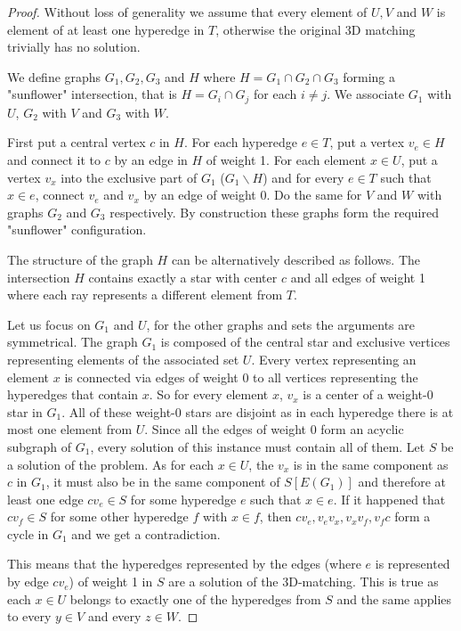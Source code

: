 \begin{proof}
Without loss of generality we assume that every element of $U,V$ and $W$ is element of at least one hyperedge in $T$, otherwise the original 3D matching trivially has no solution. 

We define graphs $G_1,G_2,G_3$ and $H$ where $H = G_1 \cap G_2 \cap G_3$ forming a "sunflower" intersection, that is $H = G_i \cap G_j$ for each $i \neq j$. We associate $G_1$ with $U$, $G_2$ with $V$ and $G_3$ with $W$. 

First put a central vertex $c$ in $H$. For each hyperedge $e\in T$, put a vertex $v_e\in H$ and connect it to $c$ by an edge in $H$ of weight 1. For each element $x\in U$, put a vertex $v_x$ into the exclusive part of $G_1$ ($G_1 \backslash H$) and for every $e \in T$ such that $x \in e$, connect $v_e$ and $v_x$ by an edge of weight 0. Do the same for $V$ and $W$ with graphs $G_2$ and $G_3$ respectively. By construction these graphs form the required "sunflower" configuration. 

The structure of the graph $H$ can be alternatively described as follows. The intersection $H$ contains exactly a star with center $c$ and all edges of weight 1 where each ray represents a different element from $T$. 

Let us focus on $G_1$ and $U$, for the other graphs and sets the arguments are symmetrical. The graph $G_1$ is composed of the central star and exclusive vertices representing elements of the associated set $U$. Every vertex representing an element $x$ is connected via edges of weight 0 to all vertices representing the hyperedges that contain $x$. So for every element $x$, $v_x$ is a center of a weight-0 star in $G_1$. All of these weight-0 stars are disjoint as in each hyperedge there is at most one element from $U$. Since all the edges of weight 0 form an acyclic subgraph of $G_1$, every solution of this \SMST instance must contain all of them. Let $S$ be a solution of the \SMST problem. As for each $x \in U$, the $v_x$ is in the same component as $c$ in $G_1$, it must also be in the same component of $S[E(G_1)]$ and therefore at least one edge $cv_e \in S$ for some hyperedge $e$ such that $x \in e$. If it happened that $cv_f \in S$ for some other hyperedge $f$ with $x \in f$, then $cv_e,v_ev_x,v_xv_f,v_fc$ form a cycle in $G_1$ and we get a contradiction. 

This means that the hyperedges represented by the edges (where $e$ is represented by edge $cv_e$) of weight 1 in $S$ are a solution of the 3D-matching. This is true as each $x \in U$ belongs to exactly one of the hyperedges from $S$ and the same applies to every $y \in V$ and every $z \in W$. 


\end{proof}
